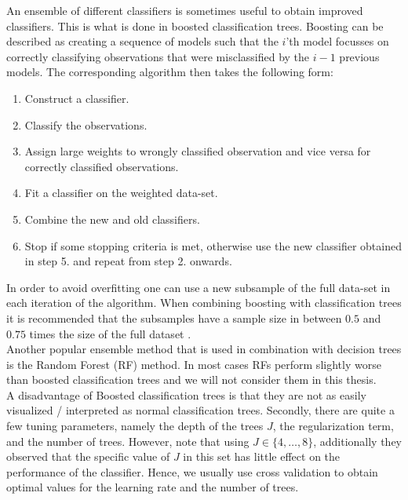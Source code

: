 An ensemble of different classifiers is sometimes useful to obtain improved classifiers. This is what is done in boosted classification trees. Boosting can be described as creating a sequence of models such that the $i$'th model focusses on correctly classifying observations that were misclassified by the $i-1$ previous models. The corresponding algorithm then takes the following form:
\begin{enumerate}
\item Construct a classifier.
\item Classify the observations.
\item Assign large weights to wrongly classified observation and vice versa for correctly classified observations. 
\item Fit a classifier on the weighted data-set.
\item Combine the new and old classifiers.
\item Stop if some stopping criteria is met, otherwise use the new classifier obtained in step 5. and repeat from step 2. onwards.
\end{enumerate}

In order to avoid overfitting one can use a new subsample of the full data-set in each iteration of the algorithm. When combining boosting with classification trees it is recommended that the subsamples have a sample size in between $0.5$ and $0.75$ times the size of the full dataset \parencite{elith_working_2008}.\\

Another popular ensemble method that is used in combination with decision trees is the Random Forest (RF) method. In most cases RFs perform slightly worse than boosted classification trees \parencite{hastie_elements_2009} and we will not consider them in this thesis.\\

A disadvantage of Boosted classification trees is that they are not as easily visualized / interpreted as normal classification trees. Secondly, there are quite a few tuning parameters, namely the depth of the trees $J$, the regularization term, and the number of trees. However, \cite{hastie_elements_2009} note that using $J \in \{4,\dots,8\}$, additionally they observed that the specific value of $J$ in this set has little effect on the performance of the classifier. Hence, we usually use cross validation to obtain optimal values for the learning rate and the number of trees.\\

